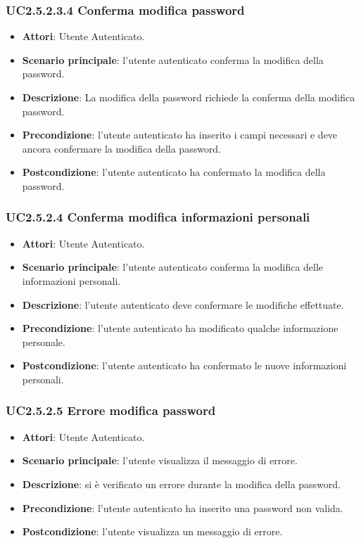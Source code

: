 \subsubsection{UC2.5.2.3.4 Conferma modifica password}
\begin{itemize}
\item \textbf{Attori}: Utente Autenticato.
\item \textbf{Scenario principale}: l'utente autenticato conferma la modifica della password.
\item \textbf{Descrizione}: La modifica della password richiede la conferma della modifica password.
\item \textbf{Precondizione}: l'utente autenticato ha inserito i campi necessari e deve ancora confermare la modifica della password.
\item \textbf{Postcondizione}: l'utente autenticato ha confermato la modifica della password.
\end{itemize}
\subsubsection{UC2.5.2.4 Conferma modifica informazioni personali}
\begin{itemize}
\item \textbf{Attori}: Utente Autenticato.
\item \textbf{Scenario principale}: l'utente autenticato conferma la modifica delle informazioni personali.
\item \textbf{Descrizione}: l'utente autenticato deve confermare le modifiche effettuate.
\item \textbf{Precondizione}: l'utente autenticato ha modificato qualche informazione personale.
\item \textbf{Postcondizione}: l'utente autenticato ha confermato  le nuove informazioni personali.
\end{itemize}
\subsubsection{UC2.5.2.5 Errore modifica password}
\begin{itemize}
\item \textbf{Attori}: Utente Autenticato.
\item \textbf{Scenario principale}: l'utente visualizza il messaggio di errore.
\item \textbf{Descrizione}: si è verificato un errore durante la modifica della password.
\item \textbf{Precondizione}: l'utente autenticato ha inserito una password non valida.
\item \textbf{Postcondizione}: l'utente visualizza un messaggio di errore.
\end{itemize}
